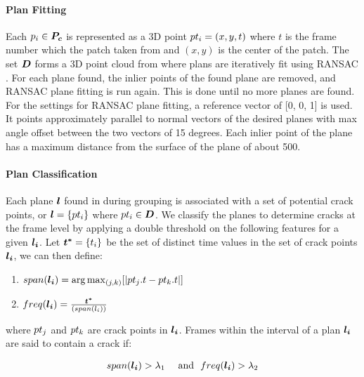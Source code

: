             \paragraph{Plan Fitting}
                Each $p_i \in \boldsymbol{P_c}$ is represented as a 3D point $pt_i = (x, y, t)$ where $t$ is the frame number which the patch taken from and $(x,y)$ is the center of the patch. The set $\boldsymbol{D}$ forms a 3D point cloud from where plans are iteratively fit using RANSAC \comment{[X]}. For each plane found, the inlier points of the found plane are removed, and RANSAC plane fitting is run again. This is done until no more planes are found.  For the settings for RANSAC plane fitting, a reference vector of [0, 0, 1] is used. It points approximately parallel to normal vectors of the desired planes with max angle offset between the two vectors of 15 degrees. Each inlier point of the plane has a maximum distance from the surface of the plane of about 500.
            
            \paragraph{Plan Classification} 
                Each plane $\boldsymbol{l}$ found in during grouping is associated with a set of potential crack points, or $\boldsymbol{l} = \{pt_i\}$ where $pt_i \in \boldsymbol{D}$. We classify the planes to determine cracks at the frame level by applying a double threshold on the following features for a given $\boldsymbol{l_i}$. Let $\boldsymbol{t^{*}}=\{t_i\}$ be the set of distinct time values in the set of crack points $\boldsymbol{l_i}$, we can then define:
                \begin{enumerate}
                    \item  $span(\boldsymbol{l_i}) = \arg\max_{(j,k)}[|pt_j.t - pt_k.t|]$ 
                    \item  $freq(\boldsymbol{l_i}) = \frac{\boldsymbol{t^{*}}}{(span(l_i))}$
                \end{enumerate}
                where $pt_j$ and $pt_k$ are crack points in $\boldsymbol{l_i}$. Frames within the interval of a plan $\boldsymbol{l_i}$ are said to contain a crack if:
                
                \begin{gather}
                    \label{DualThresh}
                    \threshOneName(\planTermi) > \lambda_1 $ \text{ } \text{ and } $ \threshTwoName(\planTermi) > \lambda_2
                \end{gather}
                

